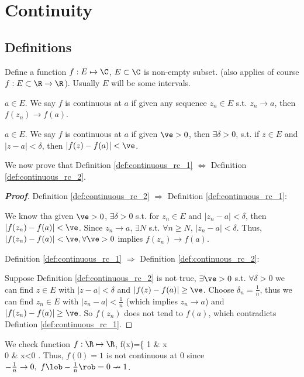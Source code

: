 \section{Continuity}

\subsection{Definitions}

Define a function $f:E\mapsto \C$, $E\subset \C$ is non-empty subset. (also applies of course $f: E\subset \R\to\R$). Usually $E$ will be some intervals.

\begin{definition}\label{def:continuous_rc_1}
$a\in E$. We say $f$ is continuous at $a$ if given any sequence $z_n\in E$ s.t. $z_n\to a$, then $f(z_n)\to f(a)$.
\end{definition}

\begin{definition}\label{def:continuous_rc_2}
$a\in E$. We say $f$ is continuous at $a$ if given $\ve>0$, then $\exists \delta>0$, s.t. if $z\in E$ and $|z-a|<\delta$, then $|f(z)- f(a)|<\ve$.
\end{definition}

We now prove that Definition \ref{def:continuous_rc_1} $\Leftrightarrow$ Definition \ref{def:continuous_rc_2}.

\begin{proof}[\bf Proof]
Definition \ref{def:continuous_rc_2} $\Rightarrow$ Definition \ref{def:continuous_rc_1}:

We know tha given $\ve>0$, $\exists \delta>0$ s.t. for $z_n\in E$ and $|z_n-a|<\delta$, then $|f(z_n)- f(a)|<\ve$. Since $z_n\to a$, $\exists N$ s.t. $\forall n\geq N$, $|z_n-a|<\delta$. Thus, $|f(z_n)- f(a)|<\ve, \forall \ve>0$ implies $f(z_n)\to f(a)$.

Definition \ref{def:continuous_rc_1} $\Rightarrow$ Definition \ref{def:continuous_rc_2}:

Suppose Definition \ref{def:continuous_rc_2} is not true, $\exists \ve>0$ s.t. $\forall \delta>0$ we can find $z\in E$ with $|z-a|<\delta$ and $|f(z)- f(a)|\geq\ve$. Choose $\delta_n=\frac 1n$, thus we can find $z_n\in E$ with $|z_n-a|<\frac 1n$ (which implies $z_n \to a$) and $|f(z_n)- f(a)|\geq\ve$. So $f(z_n)$ does not tend to $f(a)$, which contradicts Defintion \ref{def:continuous_rc_1}.
\end{proof}


\begin{example}
We check function $f:\R\mapsto\R$,
\be f(x)=\left\{ 1 & x\\ 0 & x<0
\ea \right. \ee
Thus, $f(0)=1$ is not continuous at 0 since $-\frac 1n\to 0,\ f\lob-\frac 1n\rob=0\nrightarrow 1$.
\end{example}

